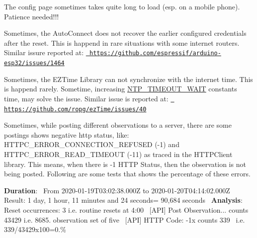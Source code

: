 \begin{DoxyEnumerate}
\item The config page sometimes takes quite long to load (esp. on a mobile phone). Patience needed!!!
\item Sometimes, the Auto\+Connect does not recover the earlier configured credentials after the reset. This is happend in rare situations with some internet routers. Similar issure reported at\+: \href{https://github.com/espressif/arduino-esp32/issues/1464}{\texttt{ https\+://github.\+com/espressif/arduino-\/esp32/issues/1464}}
\item Sometimes, the E\+Z\+Time Library can not synchronize with the internet time. This is happend rarely. Sometime, increasing \mbox{\hyperlink{main_8h_ad8124687637087b9096f96b838f93400}{N\+T\+P\+\_\+\+T\+I\+M\+E\+O\+U\+T\+\_\+\+W\+A\+IT}} constant\textquotesingle{}s time, may solve the issue. Similar issue is reported at\+: \href{https://github.com/ropg/ezTime/issues/40}{\texttt{ https\+://github.\+com/ropg/ez\+Time/issues/40}}
\item Sometimes, while posting different observations to a server, there are some postings shows negative http status, like\+: H\+T\+T\+P\+C\+\_\+\+E\+R\+R\+O\+R\+\_\+\+C\+O\+N\+N\+E\+C\+T\+I\+O\+N\+\_\+\+R\+E\+F\+U\+S\+ED (-\/1) and H\+T\+T\+P\+C\+\_\+\+E\+R\+R\+O\+R\+\_\+\+R\+E\+A\+D\+\_\+\+T\+I\+M\+E\+O\+UT (-\/11) as traced in the H\+T\+T\+P\+Client library. This means, when there is -\/1 H\+T\+TP Status, then the observation is not being posted. Following are some tests that shows the percentage of these errors.
\begin{DoxyEnumerate}
\item {\bfseries{Duration}}\+:~\newline
 From 2020-\/01-\/19T03\+:02\+:38.\+000Z to 2020-\/01-\/20T04\+:14\+:02.\+000Z~\newline
 Result\+: 1 day, 1 hour, 11 minutes and 24 seconds= 90,684 seconds~\newline
 {\bfseries{Analysis}}\+:~\newline
 Reset occurrences\+: 3 i.\+e. routine resets at 4\+:00~\newline
 \mbox{[}A\+PI\mbox{]} Post Observation... counts 43429 i.\+e. 8685. observation set of five~\newline
 \mbox{[}A\+PI\mbox{]} H\+T\+TP Code\+: -\/1x counts 339~\newline
 i.\+e. 339/43429x100=0.\%~\newline


\end{DoxyEnumerate}
\end{DoxyEnumerate}
